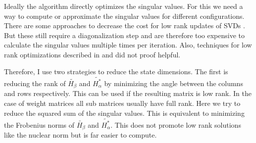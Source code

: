 \documentclass[numbers=noenddot,doctype=mastersthesis,BCOR=15mm,biblatex]{ldvbook}%
\begin{document}
Ideally the algorithm directly optimizes the singular values.
For this we need a way to compute or approximate the singular values for different configurations. 
There are some approaches to decrease the cost for low rank updates of SVDs \cite{brand_fast_2006}.
But these still require a diagonalization step and are therefore too expensive to calculate the singular values multiple times per iteration.
Also, techniques for low rank optimizations described in \cite{liu_interior-point_2010} and \cite{recht_guaranteed_2010} did not proof helpful.

Therefore, I use two strategies to reduce the state dimensions.
The first is reducing the rank of $\tilde{H_\beta}$ and $\tilde{H_\alpha^*}$ by minimizing the angle between the columns and rows respectively.
This can be used if the resulting matrix is low rank.
In the case of weight matrices all sub matrices usually have full rank.
Here we try to reduce the squared sum of the singular values.
This is equivalent to minimizing the Frobenius norms of $\tilde{H_\beta}$ and $\tilde{H_\alpha^*}$.
This does not promote low rank solutions like the nuclear norm but is far easier to compute.
\end{document}
